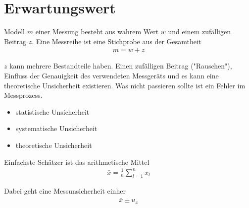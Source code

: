 \section{Erwartungswert}
Modell $m$ einer Messung besteht aus wahrem Wert $w$ und einem zufälligen Beitrag $z$. Eine Messreihe ist eine Stichprobe aus der Gesamtheit
\begin{align}
		m = w + z
\end{align}

$z$ kann mehrere Bestandteile haben. Einen zufälligen Beitrag ("Rauschen"), Einfluss der Genauigkeit des verwendeten Messgeräts und es kann eine theoretische Unsicherheit existieren. Was nicht passieren sollte ist ein Fehler im Messprozess.
\begin{itemize}
	\item statistische Unsicherheit
	\item systematische Unsicherheit
	\item theoretische Unsicherheit
\end{itemize}

Einfachste Schätzer ist das arithmetische Mittel
\begin{align}
	\bar{x} = \frac{1}{n} \sum_{l=1}^{n}x_{l}
\end{align}

Dabei geht eine Messunsicherheit einher
\begin{align}
	\bar{x} \pm u_{x}
\end{align} 